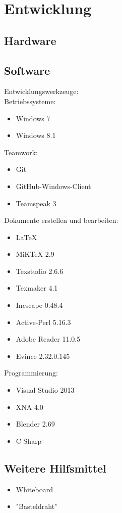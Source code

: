 \chapter{Entwicklung}

\section{Hardware}



\section{Software}

Entwicklungswerkzeuge:\\

Betriebssysteme:

\begin{itemize}

\item Windows 7
\item Windows 8.1

\end{itemize}

Teamwork:

\begin{itemize}

\item Git
\item GitHub-Windows-Client
\item Teamspeak 3

\end{itemize}

Dokumente erstellen und bearbeiten:

\begin{itemize}

\item LaTeX

\item MiKTeX 2.9
\item Texstudio 2.6.6
\item Texmaker 4.1
\item Incscape 0.48.4 
\item Active-Perl 5.16.3
\item Adobe Reader 11.0.5
\item Evince 2.32.0.145

\end{itemize}

Programmierung:

\begin{itemize}

\item Visual Studio 2013
\item XNA 4.0
\item Blender 2.69

\item C-Sharp

\end{itemize}


\section{Weitere Hilfsmittel}

\begin{itemize}

\item Whiteboard
\item "Basteldraht" 

\end{itemize}

